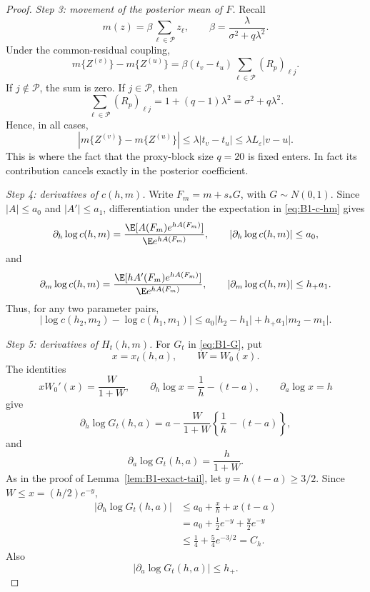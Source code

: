 \begin{proof}
\medskip
\noindent
\emph{Step 3: movement of the posterior mean of \(F\).}
Recall
\[
 m(z)=\beta\sum_{\ell\in\mathcal P}z_\ell,
 \qquad
 \beta=\frac{\lambda}{\sigma^2+q\lambda^2}.
\]
Under the common-residual coupling,
\[
 m\{Z^{(v)}\}-m\{Z^{(u)}\}
 =
 \beta(t_v-t_u)
 \sum_{\ell\in\mathcal P}(R_p)_{\ell j}.
\]
If \(j\notin\mathcal P\), the sum is zero. If
\(j\in\mathcal P\), then
\[
 \sum_{\ell\in\mathcal P}(R_p)_{\ell j}
 =
 1+(q-1)\lambda^2
 =
 \sigma^2+q\lambda^2.
\]
Hence, in all cases,
\begin{equation}
 |m\{Z^{(v)}\}-m\{Z^{(u)}\}|
 \le
 \lambda|t_v-t_u|
 \le
 \lambda L_\varepsilon|v-u|.
 \label{eq:B1-m-difference}
\end{equation}
This is where the fact that the proxy-block size \(q=20\) is
fixed enters. In fact its contribution cancels exactly in the
posterior coefficient.

\medskip
\noindent
\emph{Step 4: derivatives of \(c(h,m)\).}
Write \(F_m=m+s_*G\), with \(G\sim N(0,1)\). Since
\(|A|\le a_0\) and \(|A'|\le a_1\), differentiation under the
expectation in \eqref{eq:B1-c-hm} gives
\begin{equation}
 \partial_h\log c(h,m)
 =
 \frac{\E[A(F_m)e^{hA(F_m)}]}
      {\E e^{hA(F_m)}},
 \qquad
 |\partial_h\log c(h,m)|\le a_0,
 \label{eq:B1-c-h-derivative}
\end{equation}
and
\begin{equation}
 \partial_m\log c(h,m)
 =
 \frac{\E[hA'(F_m)e^{hA(F_m)}]}
      {\E e^{hA(F_m)}},
 \qquad
 |\partial_m\log c(h,m)|\le h_+a_1.
 \label{eq:B1-c-m-derivative}
\end{equation}
Thus, for any two parameter pairs,
\begin{equation}
 |\log c(h_2,m_2)-\log c(h_1,m_1)|
 \le
 a_0|h_2-h_1|+h_+a_1|m_2-m_1|.
 \label{eq:B1-c-Lipschitz}
\end{equation}

\medskip
\noindent
\emph{Step 5: derivatives of \(H_t(h,m)\).}
For \(G_t\) in \eqref{eq:B1-G}, put
\[
 x=x_t(h,a),\qquad W=W_0(x).
\]
The identities
\[
 xW_0'(x)=\frac{W}{1+W},
 \qquad
 \partial_h\log x=\frac1h-(t-a),
 \qquad
 \partial_a\log x=h
\]
give
\begin{equation}
 \partial_h\log G_t(h,a)
 =
 a-\frac{W}{1+W}
 \left\{\frac1h-(t-a)\right\},
 \label{eq:B1-G-h}
\end{equation}
and
\begin{equation}
 \partial_a\log G_t(h,a)
 =
 \frac{h}{1+W}.
 \label{eq:B1-G-a}
\end{equation}
As in the proof of Lemma~\ref{lem:B1-exact-tail}, let
\(y=h(t-a)\ge3/2\). Since \(W\le x=(h/2)e^{-y}\),
\begin{align}
 |\partial_h\log G_t(h,a)|
 &\le
 a_0+\frac{x}{h}+x(t-a)
 \nonumber\\
 &=
 a_0+\frac12e^{-y}+\frac y2e^{-y}
 \nonumber\\
 &\le
 \frac14+\frac54e^{-3/2}
 =C_h.
 \label{eq:B1-G-h-bound}
\end{align}
Also
\begin{equation}
 |\partial_a\log G_t(h,a)|\le h_+.
 \label{eq:B1-G-a-bound}
\end{equation}


\end{proof}
